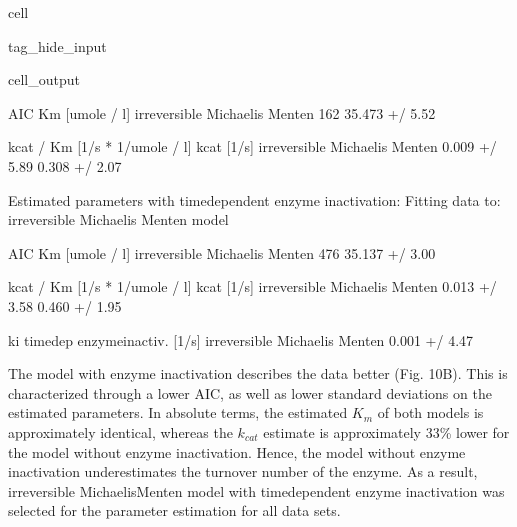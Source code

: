 \documentclass[letterpaper,12pt,english]{jupyterBook}
\begin{document}
\begin{sphinxuseclass}{cell}
\begin{sphinxuseclass}{tag_hide_input}
\begin{sphinxVerbatimOutput}
\begin{sphinxuseclass}{cell_output}
\begin{sphinxVerbatim}[commandchars=\\\{\}]
                               AIC    Km [umole / l]  \PYGZbs{}
irreversible Michaelis Menten \PYGZhy{}162  35.473 +/\PYGZhy{} 5.52\PYGZpc{}   

                              kcat / Km [1/s * 1/umole / l]       kcat [1/s]  
irreversible Michaelis Menten               0.009 +/\PYGZhy{} 5.89\PYGZpc{}  0.308 +/\PYGZhy{} 2.07\PYGZpc{}  
\end{sphinxVerbatim}

\begin{sphinxVerbatim}[commandchars=\\\{\}]
Estimated parameters with time\PYGZhy{}dependent enzyme inactivation:
Fitting data to:
 \PYGZhy{} irreversible Michaelis Menten model
\end{sphinxVerbatim}

\begin{sphinxVerbatim}[commandchars=\\\{\}]
                               AIC    Km [umole / l]  \PYGZbs{}
irreversible Michaelis Menten \PYGZhy{}476  35.137 +/\PYGZhy{} 3.00\PYGZpc{}   

                              kcat / Km [1/s * 1/umole / l]       kcat [1/s]  \PYGZbs{}
irreversible Michaelis Menten               0.013 +/\PYGZhy{} 3.58\PYGZpc{}  0.460 +/\PYGZhy{} 1.95\PYGZpc{}   

                              ki time\PYGZhy{}dep enzyme\PYGZhy{}inactiv. [1/s]  
irreversible Michaelis Menten                   0.001 +/\PYGZhy{} 4.47\PYGZpc{}  
\end{sphinxVerbatim}

\noindent{}

\end{sphinxuseclass}\end{sphinxVerbatimOutput}

\end{sphinxuseclass}
\end{sphinxuseclass}
\sphinxAtStartPar
{}

\sphinxAtStartPar
The model with enzyme inactivation describes the data better (Fig. 10B). This is characterized through a lower AIC, as well as lower standard deviations on the estimated parameters.
In absolute terms, the estimated \(K_{m}\) of both models is approximately identical, whereas the \(k_{cat}\) estimate is approximately 33\% lower for the model without enzyme inactivation. Hence, the model without enzyme inactivation underestimates the turnover number of the enzyme. As a result, irreversible Michaelis\sphinxhyphen{}Menten model with time\sphinxhyphen{}dependent enzyme inactivation was selected for the parameter estimation for all data sets.
\end{document}
